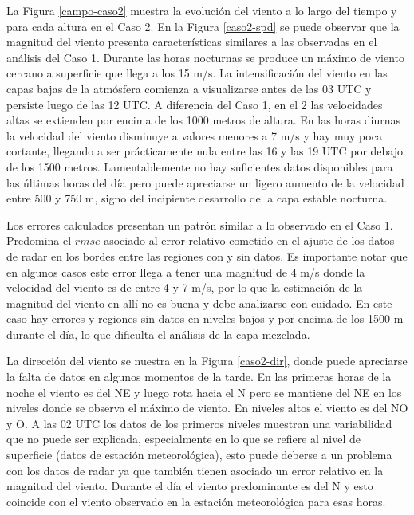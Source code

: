\documentclass[12pt,spanish,oneside, a4paper]{book}
\begin{document}
La Figura \ref{campo-caso2} muestra la evolución del viento a lo largo
del tiempo y para cada altura en el Caso 2. En la Figura \ref{caso2-spd}
se puede observar que la magnitud del viento presenta características
similares a las observadas en el análisis del Caso 1. Durante las horas
nocturnas se produce un máximo de viento cercano a superficie que llega
a los 15 m/s. La intensificación del viento en las capas bajas de la
atmósfera comienza a visualizarse antes de las 03 UTC y persiste luego
de las 12 UTC. A diferencia del Caso 1, en el 2 las velocidades altas se
extienden por encima de los 1000 metros de altura. En las horas diurnas
la velocidad del viento disminuye a valores menores a 7 m/s y hay muy
poca cortante, llegando a ser prácticamente nula entre las 16 y las 19
UTC por debajo de los 1500 metros. Lamentablemente no hay suficientes
datos disponibles para las últimas horas del día pero puede apreciarse
un ligero aumento de la velocidad entre 500 y 750 m, signo del
incipiente desarrollo de la capa estable nocturna.

Los errores calculados presentan un patrón similar a lo observado en el
Caso 1. Predomina el \(rmse\) asociado al error relativo cometido en el
ajuste de los datos de radar en los bordes entre las regiones con y sin
datos. Es importante notar que en algunos casos este error llega a tener
una magnitud de 4 m/s donde la velocidad del viento es de entre 4 y 7
m/s, por lo que la estimación de la magnitud del viento en allí no es
buena y debe analizarse con cuidado. En este caso hay errores y regiones
sin datos en niveles bajos y por encima de los 1500 m durante el día, lo
que dificulta el análisis de la capa mezclada.

La dirección del viento se nuestra en la Figura \ref{caso2-dir}, donde
puede apreciarse la falta de datos en algunos momentos de la tarde. En
las primeras horas de la noche el viento es del NE y luego rota hacia el
N pero se mantiene del NE en los niveles donde se observa el máximo de
viento. En niveles altos el viento es del NO y O. A las 02 UTC los datos
de los primeros niveles muestran una variabilidad que no puede ser
explicada, especialmente en lo que se refiere al nivel de superficie
(datos de estación meteorológica), esto puede deberse a un problema con
los datos de radar ya que también tienen asociado un error relativo en
la magnitud del viento. Durante el día el viento predominante es del N y
esto coincide con el viento observado en la estación meteorológica para
esas horas.
\end{document}

